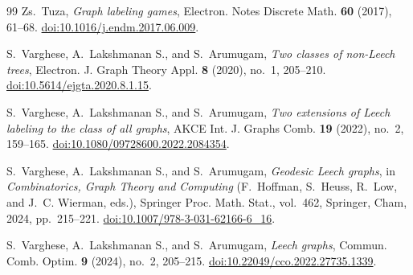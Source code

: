 \documentclass[11pt]{article}
\theoremstyle{definition}
\theoremstyle{remark}
\numberwithin{equation}{section}
\begin{document}
\begin{thebibliography}{99}
Zs.~Tuza,
\emph{Graph labeling games},
Electron. Notes Discrete Math. \textbf{60} (2017), 61--68.
\href{https://doi.org/10.1016/j.endm.2017.06.009}{doi:10.1016/j.endm.2017.06.009}.

S.~Varghese, A.~Lakshmanan S., and S.~Arumugam,
\emph{Two classes of non-Leech trees},
Electron. J. Graph Theory Appl. \textbf{8} (2020), no.~1, 205--210.
\href{https://doi.org/10.5614/ejgta.2020.8.1.15}{doi:10.5614/ejgta.2020.8.1.15}.

S.~Varghese, A.~Lakshmanan S., and S.~Arumugam,
\emph{Two extensions of Leech labeling to the class of all graphs},
AKCE Int. J. Graphs Comb. \textbf{19} (2022), no.~2, 159--165.
\href{https://doi.org/10.1080/09728600.2022.2084354}{doi:10.1080/09728600.2022.2084354}.

S.~Varghese, A.~Lakshmanan S., and S.~Arumugam,
\emph{Geodesic Leech graphs},
in \emph{Combinatorics, Graph Theory and Computing} (F.~Hoffman, S.~Heuss, R.~Low, and J.~C. Wierman, eds.),
Springer Proc. Math. Stat., vol.~462,
Springer, Cham, 2024, pp.~215--221.
\href{https://doi.org/10.1007/978-3-031-62166-6_16}{doi:10.1007/978-3-031-62166-6\_16}.

S.~Varghese, A.~Lakshmanan S., and S.~Arumugam,
\emph{Leech graphs},
Commun. Comb. Optim. \textbf{9} (2024), no.~2, 205--215.
\href{https://doi.org/10.22049/cco.2022.27735.1339}{doi:10.22049/cco.2022.27735.1339}.

\end{thebibliography}
\end{document}
